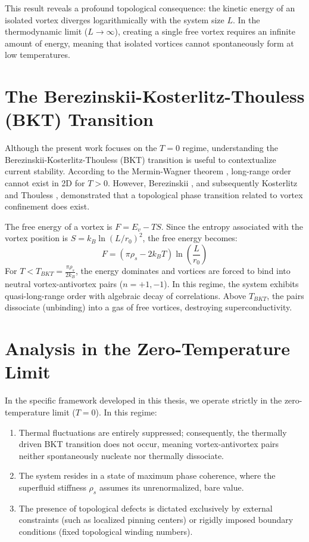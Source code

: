 \documentclass[english,binding=0.6cm,noexaminfo]{sapthesis}
\newcommand{\rhos}{\rho_s}
\begin{document}
This result reveals a profound topological consequence: the kinetic energy of an isolated vortex diverges logarithmically with the system size $L$. In the thermodynamic limit ($L \to \infty$), creating a single free vortex requires an infinite amount of energy, meaning that isolated vortices cannot spontaneously form at low temperatures.

\section{The Berezinskii-Kosterlitz-Thouless (BKT) Transition}

Although the present work focuses on the $T=0$ regime, understanding the Berezinskii-Kosterlitz-Thouless (BKT) transition is useful to contextualize current stability. According to the Mermin-Wagner theorem \cite{mermin1966absence}, long-range order cannot exist in 2D for $T>0$. However, Berezinskii \cite{berezinskii1971destruction, berezinskii1972destruction}, and subsequently Kosterlitz and Thouless \cite{kosterlitz1973ordering}, demonstrated that a topological phase transition related to vortex confinement does exist.

The free energy of a vortex is $F = E_v - TS$. Since the entropy associated with the vortex position is $S = k_B \ln(L/r_0)^2$, the free energy becomes:
\begin{equation}
    F = (\pi \rhos - 2k_B T) \ln\left(\frac{L}{r_0}\right)
\end{equation}
For $T < T_{BKT} = \frac{\pi \rhos}{2k_B}$, the energy dominates and vortices are forced to bind into neutral vortex-antivortex pairs ($n=+1, -1$). In this regime, the system exhibits quasi-long-range order with algebraic decay of correlations. Above $T_{BKT}$, the pairs dissociate (unbinding) into a gas of free vortices, destroying superconductivity.

\section{Analysis in the Zero-Temperature Limit}

In the specific framework developed in this thesis, we operate strictly in the zero-temperature limit ($T=0$). In this regime:
\begin{enumerate}
    \item Thermal fluctuations are entirely suppressed; consequently, the thermally driven BKT transition does not occur, meaning vortex-antivortex pairs neither spontaneously nucleate nor thermally dissociate.
    \item The system resides in a state of maximum phase coherence, where the superfluid stiffness $\rho_s$ assumes its unrenormalized, bare value.
    \item The presence of topological defects is dictated exclusively by external constraints (such as localized pinning centers) or rigidly imposed boundary conditions (fixed topological winding numbers).
\end{enumerate}
\end{document}
